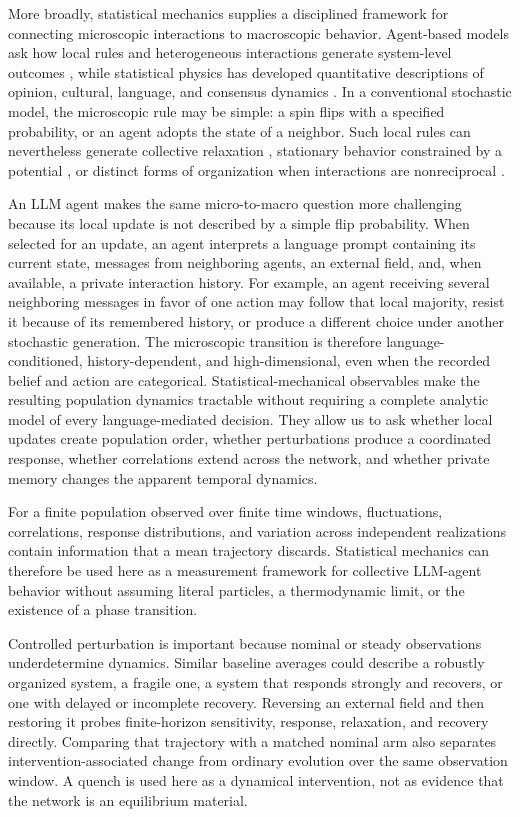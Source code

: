 \documentclass[12pt]{article}
\begin{document}
More broadly, statistical mechanics supplies a disciplined framework for
connecting microscopic interactions to macroscopic behavior. Agent-based
models ask how local rules and heterogeneous interactions generate
system-level outcomes \cite{bonabeau2002}, while statistical physics has
developed quantitative descriptions of opinion, cultural, language, and
consensus dynamics \cite{castellano2009,baronchelli2018}. In a conventional
stochastic model, the microscopic rule may be simple: a spin flips with a
specified probability, or an agent adopts the state of a neighbor. Such local
rules can nevertheless generate collective relaxation \cite{glauber1963},
stationary behavior constrained by a potential \cite{blume1993}, or distinct
forms of organization when interactions are nonreciprocal
\cite{fruchart2021}.

An LLM agent makes the same micro-to-macro question more challenging because
its local update is not described by a simple flip probability. When selected
for an update, an agent interprets a language prompt containing its current
state, messages from neighboring agents, an external field, and, when
available, a private interaction history. For example, an agent receiving
several neighboring messages in favor of one action may follow that local
majority, resist it because of its remembered history, or produce a different
choice under another stochastic generation. The microscopic transition is
therefore language-conditioned, history-dependent, and high-dimensional, even
when the recorded belief and action are categorical. Statistical-mechanical
observables make the resulting population dynamics tractable without requiring
a complete analytic model of every language-mediated decision. They allow us
to ask whether local updates create population order, whether perturbations
produce a coordinated response, whether correlations extend across the
network, and whether private memory changes the apparent temporal dynamics.

For a finite population observed over finite time windows, fluctuations,
correlations, response distributions, and variation across independent
realizations contain information that a mean trajectory discards. Statistical
mechanics can therefore be used here as a measurement framework for collective
LLM-agent behavior without assuming literal particles, a thermodynamic limit,
or the existence of a phase transition.


Controlled perturbation is important because nominal or steady observations
underdetermine dynamics.  Similar baseline averages could describe a robustly
organized system, a fragile one, a system that responds strongly and
recovers, or one with delayed or incomplete recovery.  Reversing an external
field and then restoring it probes finite-horizon sensitivity, response,
relaxation, and recovery directly.  Comparing that trajectory with a matched
nominal arm also separates intervention-associated change from ordinary
evolution over the same observation window.  A quench is used here as a
dynamical intervention, not as evidence that the network is an equilibrium
material.
\end{document}
